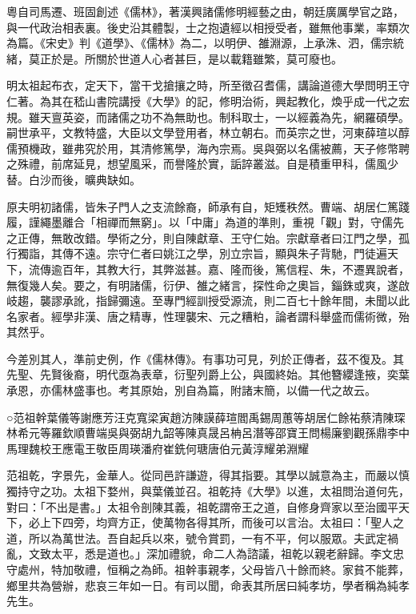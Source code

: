 
\begin{pinyinscope}
粵自司馬遷、班固創述《儒林》，著漢興諸儒修明經藝之由，朝廷廣厲學官之路，與一代政治相表裏。後史沿其體製，士之抱遺經以相授受者，雖無他事業，率類次為篇。《宋史》判《道學》、《儒林》為二，以明伊、雒淵源，上承洙、泗，儒宗統緒，莫正於是。所關於世道人心者甚巨，是以載籍雖繁，莫可廢也。

明太祖起布衣，定天下，當干戈搶攘之時，所至徵召耆儒，講論道德大學問明王守仁著。為其在嵇山書院講授《大學》的記，修明治術，興起教化，煥乎成一代之宏規。雖天亶英姿，而諸儒之功不為無助也。制科取士，一以經義為先，網羅碩學。嗣世承平，文教特盛，大臣以文學登用者，林立朝右。而英宗之世，河東薛瑄以醇儒預機政，雖弗究於用，其清修篤學，海內宗焉。吳與弼以名儒被薦，天子修幣聘之殊禮，前席延見，想望風采，而譽隆於實，詬誶叢滋。自是積重甲科，儒風少替。白沙而後，曠典缺如。

原夫明初諸儒，皆朱子門人之支流餘裔，師承有自，矩矱秩然。曹端、胡居仁篤踐履，謹繩墨離合「相禪而無窮」。以「中庸」為道的準則，重視「觀」對，守儒先之正傳，無敢改錯。學術之分，則自陳獻章、王守仁始。宗獻章者曰江門之學，孤行獨詣，其傳不遠。宗守仁者曰姚江之學，別立宗旨，顯與朱子背馳，門徒遍天下，流傳逾百年，其教大行，其弊滋甚。嘉、隆而後，篤信程、朱，不遷異說者，無復幾人矣。要之，有明諸儒，衍伊、雒之緒言，探性命之奧旨，錙銖或爽，遂啟岐趨，襲謬承訛，指歸彌遠。至專門經訓授受源流，則二百七十餘年間，未聞以此名家者。經學非漢、唐之精專，性理襲宋、元之糟粕，論者謂科舉盛而儒術微，殆其然乎。

今差別其人，準前史例，作《儒林傳》。有事功可見，列於正傳者，茲不復及。其先聖、先賢後裔，明代亟為表章，衍聖列爵上公，與國終始。其他簪纓逢掖，奕葉承恩，亦儒林盛事也。考其原始，別自為篇，附諸末簡，以備一代之故云。

○范祖幹葉儀等謝應芳汪克寬梁寅趙汸陳謨薛瑄閻禹錫周蕙等胡居仁餘祐蔡清陳琛林希元等羅欽順曹端吳與弼胡九韶等陳真晟呂柟呂潛等邵寶王問楊廉劉觀孫鼎李中馬理魏校王應電王敬臣周瑛潘府崔銑何瑭唐伯元黃淳耀弟淵耀

范祖乾，字景先，金華人。從同邑許謙遊，得其指要。其學以誠意為主，而嚴以慎獨持守之功。太祖下婺州，與葉儀並召。祖乾持《大學》以進，太祖問治道何先，對曰：「不出是書。」太祖令剖陳其義，祖乾謂帝王之道，自修身齊家以至治國平天下，必上下四旁，均齊方正，使萬物各得其所，而後可以言治。太祖曰：「聖人之道，所以為萬世法。吾自起兵以來，號令賞罰，一有不平，何以服眾。夫武定禍亂，文致太平，悉是道也。」深加禮貌，命二人為諮議，祖乾以親老辭歸。李文忠守處州，特加敬禮，恒稱之為師。祖幹事親孝，父母皆八十餘而終。家貧不能葬，鄉里共為營辦，悲哀三年如一日。有司以聞，命表其所居曰純孝坊，學者稱為純孝先生。


\end{pinyinscope}
